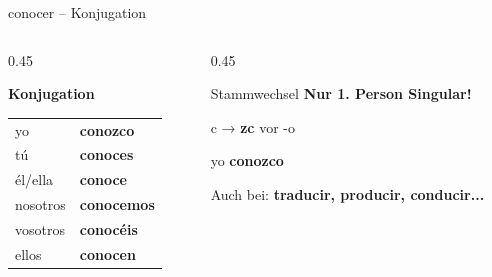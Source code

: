 \documentclass[aspectratio=169, 11pt]{beamer}
\newcommand{\seriftext}[1]{{\fontfamily{ppl}\selectfont #1}}
\newcommand{\es}[1]{\seriftext{\textbf{#1}}}
\newcommand{\stw}[1]{\textcolor{stamm}{\textbf{#1}}}
\begin{document}

\begin{frame}{conocer -- Konjugation}
    \vspace{0.3cm}

    \begin{columns}[T]
        \begin{column}{0.45\textwidth}
            \begin{center}
                {\large\textbf{Konjugation}}

                \vspace{0.5cm}

                \begin{tabular}{ll}
                    yo & \es{cono\stw{zc}o} \\[0.4em]
                    tú & \es{conoces} \\[0.4em]
                    él/ella & \es{conoce} \\[0.4em]
                    nosotros & \es{conocemos} \\[0.4em]
                    vosotros & \es{conocéis} \\[0.4em]
                    ellos & \es{conocen} \\
                \end{tabular}
            \end{center}
        \end{column}

        \begin{column}{0.45\textwidth}
            \vspace{1cm}

            \begin{block}{Stammwechsel}
                \textbf{Nur 1. Person Singular!}

                \vspace{0.3cm}

                c → \stw{zc} vor -o

                \vspace{0.3cm}

                yo \es{cono\stw{zc}o}
            \end{block}

            \vspace{0.3cm}

            {\small Auch bei: \es{traducir, producir, conducir...}}
        \end{column}
    \end{columns}
\end{frame}
\end{document}
